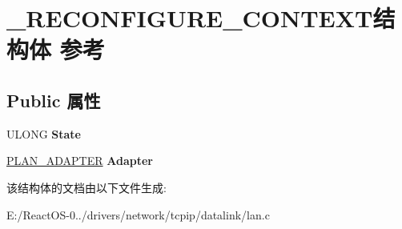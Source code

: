 \hypertarget{struct___r_e_c_o_n_f_i_g_u_r_e___c_o_n_t_e_x_t}{}\section{\+\_\+\+R\+E\+C\+O\+N\+F\+I\+G\+U\+R\+E\+\_\+\+C\+O\+N\+T\+E\+X\+T结构体 参考}
\label{struct___r_e_c_o_n_f_i_g_u_r_e___c_o_n_t_e_x_t}
\subsection*{Public 属性}
\begin{DoxyCompactItemize}
\item 
\mbox{\label{struct___r_e_c_o_n_f_i_g_u_r_e___c_o_n_t_e_x_t_a30cccc66a1338f7ed733b0dbad8ec20d}} 
U\+L\+O\+NG {\bfseries State}
\item 
\mbox{\label{struct___r_e_c_o_n_f_i_g_u_r_e___c_o_n_t_e_x_t_a1144d0d0005c9e23d9af50cb088cfe23}} 
\hyperlink{struct_l_a_n___a_d_a_p_t_e_r}{P\+L\+A\+N\+\_\+\+A\+D\+A\+P\+T\+ER} {\bfseries Adapter}
\end{DoxyCompactItemize}


该结构体的文档由以下文件生成\+:\begin{DoxyCompactItemize}
\item 
E\+:/\+React\+O\+S-\/0../drivers/network/tcpip/datalink/lan.\+c\end{DoxyCompactItemize}

